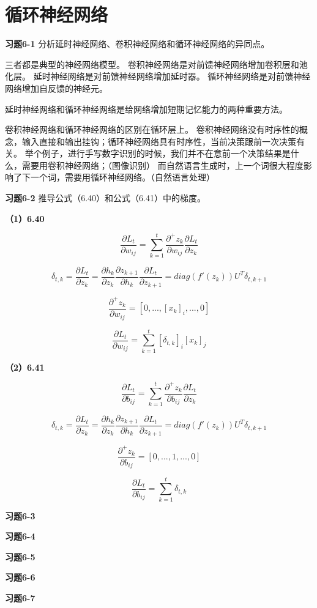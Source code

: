 \section{循环神经网络}

\noindent\textbf{习题6-1} 分析延时神经网络、卷积神经网络和循环神经网络的异同点。

三者都是典型的神经网络模型。
卷积神经网络是对前馈神经网络增加卷积层和池化层。
延时神经网络是对前馈神经网络增加延时器。
循环神经网络是对前馈神经网络增加自反馈的神经元。

延时神经网络和循环神经网络是给网络增加短期记忆能力的两种重要方法。

卷积神经网络和循环神经网络的区别在循环层上。
卷积神经网络没有时序性的概念，输入直接和输出挂钩；循环神经网络具有时序性，当前决策跟前一次决策有关。
举个例子，进行手写数字识别的时候，我们并不在意前一个决策结果是什么，需要用卷积神经网络；（图像识别）
而自然语言生成时，上一个词很大程度影响了下一个词，需要用循环神经网络。（自然语言处理）

\noindent\textbf{习题6-2} 推导公式（6.40）和公式（6.41）中的梯度。

\noindent\textbf{（1）6.40}

\[
\frac{\partial L_t}{\partial w_{ij}} = \sum_{k=1}^t \frac{\partial^+ z_k}{\partial w_{ij}} \frac{\partial L_t}{\partial z_k}
\]

\[
\delta_{t,k} = \frac{\partial L_t}{\partial z_k}
= \frac{\partial h_k}{\partial z_k} \frac{\partial z_{k+1}}{\partial h_k} \frac{\partial L_t}{\partial z_{k+1}}
= diag(f'(z_k))U^T \delta_{t,k+1}
\]

\[
\frac{\partial^+ z_k}{\partial w_{ij}} = [0,...,[x_k]_i,...,0]
\]

\[
\frac{\partial L_t}{\partial w_{ij}} = \sum_{k=1}^t [\delta_{t,k}]_i[x_k]_j
\]

\noindent\textbf{（2）6.41}

\[
\frac{\partial L_t}{\partial b_{ij}} = \sum_{k=1}^t \frac{\partial^+ z_k}{\partial b_{ij}} \frac{\partial L_t}{\partial z_k}
\]

\[
\delta_{t,k} = \frac{\partial L_t}{\partial z_k}
= \frac{\partial h_k}{\partial z_k} \frac{\partial z_{k+1}}{\partial h_k} \frac{\partial L_t}{\partial z_{k+1}}
= diag(f'(z_k))U^T \delta_{t,k+1}
\]

\[
\frac{\partial^+ z_k}{\partial b_{ij}} = [0,...,1,...,0]
\]

\[
\frac{\partial L_t}{\partial b_{ij}} = \sum_{k=1}^t \delta_{t,k}
\]

\noindent\textbf{习题6-3} 

\noindent\textbf{习题6-4}

\noindent\textbf{习题6-5}

\noindent\textbf{习题6-6}

\noindent\textbf{习题6-7} 